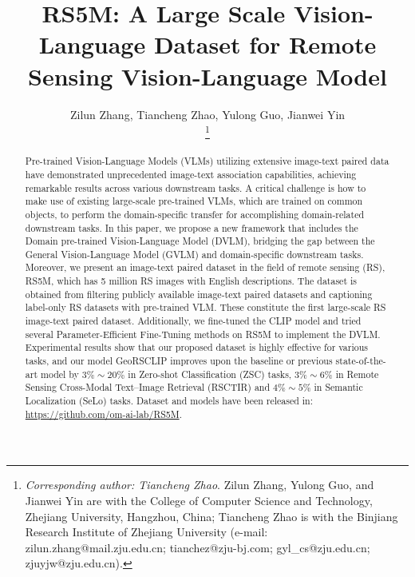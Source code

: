 \documentclass[journal]{IEEEtran}
\begin{document}
\title{RS5M: A Large Scale Vision-Language Dataset for Remote Sensing Vision-Language Model}




\author{
Zilun Zhang, 
Tiancheng Zhao,
Yulong Guo,
Jianwei Yin


\thanks{
\textit{Corresponding author: Tiancheng Zhao}. Zilun Zhang, Yulong Guo, and Jianwei Yin are with the College of Computer Science and Technology, Zhejiang University, Hangzhou, China; Tiancheng Zhao is with the Binjiang Research Institute of Zhejiang University (e-mail: zilun.zhang@mail.zju.edu.cn; tianchez@zju-bj.com; gyl\_cs@zju.edu.cn; zjuyjw@zju.edu.cn).

}
}




\maketitle

\begin{abstract}
  Pre-trained Vision-Language Models (VLMs) utilizing extensive image-text paired data have demonstrated unprecedented image-text association capabilities, achieving remarkable results across various downstream tasks. A critical challenge is how to make use of existing large-scale pre-trained VLMs, which are trained on common objects, to perform the domain-specific transfer for accomplishing domain-related downstream tasks. In this paper, we propose a new framework that includes the Domain pre-trained Vision-Language Model (DVLM), bridging the gap between the General Vision-Language Model (GVLM) and domain-specific downstream tasks. Moreover, we present an image-text paired dataset in the field of remote sensing (RS), RS5M, which has 5 million RS images with English descriptions. The dataset is obtained from filtering publicly available image-text paired datasets and captioning label-only RS datasets with pre-trained VLM. These constitute the first large-scale RS image-text paired dataset. Additionally, we fine-tuned the CLIP model and tried several Parameter-Efficient Fine-Tuning methods on RS5M to implement the DVLM. Experimental results show that our proposed dataset is highly effective for various tasks, and our model GeoRSCLIP improves upon the baseline or previous state-of-the-art model by $3\%\sim20\%$ in Zero-shot Classification (ZSC) tasks, $3\%\sim6\%$ in Remote Sensing Cross-Modal Text–Image Retrieval (RSCTIR) and $4\%\sim5\%$ in Semantic Localization (SeLo) tasks. Dataset and models have been released in: \url{https://github.com/om-ai-lab/RS5M}.
\end{abstract}
\end{document}
